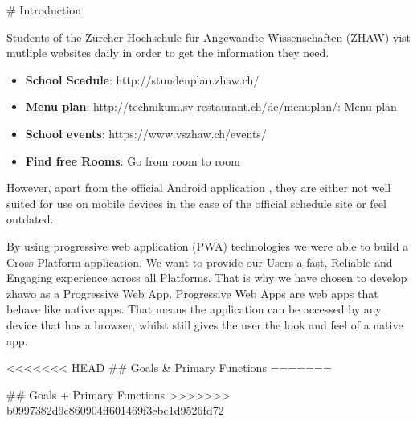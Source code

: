 \begin{markdown}

# Introduction

Students of the Zürcher Hochschule für Angewandte Wissenschaften (ZHAW) vist mutliple websites daily in order to get the information they need.

\begin{itemize}
  \item \textbf{School Scedule}: http://stundenplan.zhaw.ch/
  \item \textbf{Menu plan}: http://technikum.sv-restaurant.ch/de/menuplan/: Menu plan
  \item \textbf{School events}: https://www.vszhaw.ch/events/
  \item \textbf{Find free Rooms}: Go from room to room
\end{itemize}


However, apart from the official Android application \cite{DUMMY}, they are either not well suited for use on mobile devices in the case of the official schedule site \cite{DUMMY} or feel outdated.



By using progressive web application (PWA) technologies \cite{OurReadme} we were able to build a Cross-Platform application.
We want to provide our Users a fast, Reliable and Engaging experience across all Platforms. That is why we have chosen to develop zhawo as a Progressive Web App. Progressive Web Apps are web apps that behave like native apps. That means the application can be accessed by any device that has a browser, whilst still gives the user the look and feel of a native app.

<<<<<<< HEAD
## Goals & Primary Functions
=======


## Goals + Primary Functions
>>>>>>> b0997382d9c860904ff601469f3ebc1d9526fd72


\end{markdown}
